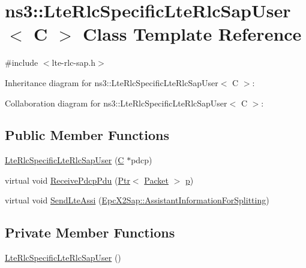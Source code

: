\hypertarget{classns3_1_1LteRlcSpecificLteRlcSapUser}{}\section{ns3\+:\+:Lte\+Rlc\+Specific\+Lte\+Rlc\+Sap\+User$<$ C $>$ Class Template Reference}
\label{classns3_1_1LteRlcSpecificLteRlcSapUser}


{\ttfamily \#include $<$lte-\/rlc-\/sap.\+h$>$}



Inheritance diagram for ns3\+:\+:Lte\+Rlc\+Specific\+Lte\+Rlc\+Sap\+User$<$ C $>$\+:


Collaboration diagram for ns3\+:\+:Lte\+Rlc\+Specific\+Lte\+Rlc\+Sap\+User$<$ C $>$\+:
\subsection*{Public Member Functions}
\begin{DoxyCompactItemize}
\item 
\hyperlink{classns3_1_1LteRlcSpecificLteRlcSapUser_a20e1282c8108e3de6bda4c8d99b10487}{Lte\+Rlc\+Specific\+Lte\+Rlc\+Sap\+User} (\hyperlink{loss__COST231__small__cities__urban_8m_aaa53ca0b650dfd85c4f59fa156f7a2cc}{C} $\ast$pdcp)
\item 
virtual void \hyperlink{classns3_1_1LteRlcSpecificLteRlcSapUser_ab25ba7d0eb0cac2905ce2bace80a9762}{Receive\+Pdcp\+Pdu} (\hyperlink{classns3_1_1Ptr}{Ptr}$<$ \hyperlink{classns3_1_1Packet}{Packet} $>$ \hyperlink{lte__link__budget__x2__handover__measures_8m_ac9de518908a968428863f829398a4e62}{p})
\item 
virtual void \hyperlink{classns3_1_1LteRlcSpecificLteRlcSapUser_a6b11f326d17e535464b90c2858cce7f1}{Send\+Lte\+Assi} (\hyperlink{structns3_1_1EpcX2Sap_1_1AssistantInformationForSplitting}{Epc\+X2\+Sap\+::\+Assistant\+Information\+For\+Splitting})
\end{DoxyCompactItemize}
\subsection*{Private Member Functions}
\begin{DoxyCompactItemize}
\item 
\hyperlink{classns3_1_1LteRlcSpecificLteRlcSapUser_afcef29ea4b8040b36f4c7d8fe8a385ed}{Lte\+Rlc\+Specific\+Lte\+Rlc\+Sap\+User} ()
\end{DoxyCompactItemize}
